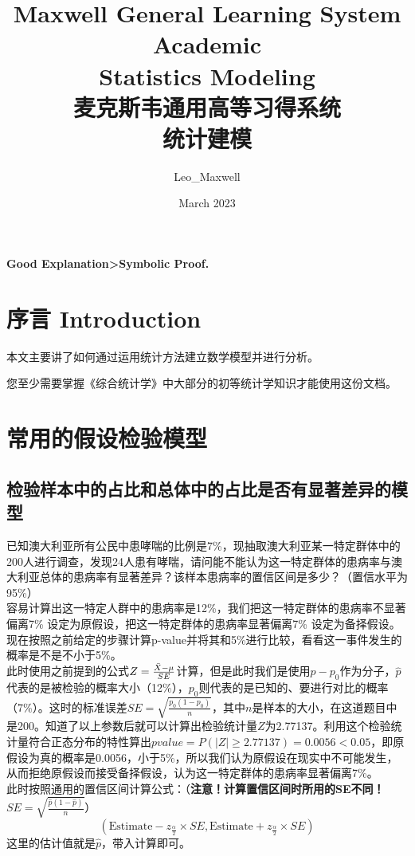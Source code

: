 \documentclass[UTF8]{ctexart}
\title{Maxwell General Learning System Academic\\ Statistics Modeling\\ 麦克斯韦通用高等习得系统\\ 统计建模}
\author{Leo\_Maxwell }
\date{March 2023}
\begin{document}
\maketitle
\vfill
\begin{center}
\textbf{Good Explanation\textgreater Symbolic Proof.}
\end{center}
\vfill

\newpage
\tableofcontents
\newpage

\section*{序言 Introduction}
本文主要讲了如何通过运用统计方法建立数学模型并进行分析。

您至少需要掌握《综合统计学》中大部分的初等统计学知识才能使用这份文档。

\section{常用的假设检验模型}
\subsection{检验样本中的占比和总体中的占比是否有显著差异的模型}
已知澳大利亚所有公民中患哮喘的比例是7\%，现抽取澳大利亚某一特定群体中的200人进行调查，发现24人患有哮喘，请问能不能认为这一特定群体的患病率与澳大利亚总体的患病率有显著差异？该样本患病率的置信区间是多少？（置信水平为95\%）\\
\indent 容易计算出这一特定人群中的患病率是12\%，我们把这一特定群体的患病率不显著偏离7\% 设定为原假设，把这一特定群体的患病率显著偏离7\% 设定为备择假设。现在按照之前给定的步骤计算p-value并将其和5\%进行比较，看看这一事件发生的概率是不是不小于5\%。\\
\indent 此时使用之前提到的公式$Z=\frac{\Bar{X}-\mu}{SE}$计算，但是此时我们是使用$\hat{p}-p_0$作为分子，$\hat{p}$代表的是被检验的概率大小（12\%），$p_0$则代表的是已知的、要进行对比的概率（7\%）。这时的标准误差$SE=\sqrt{\frac{p_0\left(1-p_0\right)}{n}}$，其中$n$是样本的大小，在这道题目中是200。知道了以上参数后就可以计算出检验统计量$Z$为2.77137。利用这个检验统计量符合正态分布的特性算出$pvalue=P(|Z|\geq 2.77137)=0.0056<0.05$，即原假设为真的概率是0.0056，小于5\%，所以我们认为原假设在现实中不可能发生，从而拒绝原假设而接受备择假设，认为这一特定群体的患病率显著偏离7\%。\\
\indent 此时按照通用的置信区间计算公式：（\textbf{注意！计算置信区间时所用的SE不同！$SE=\sqrt{\frac{\hat{p}\left(1-\hat{p}\right)}{n}}$}）
\[
\left(\text{Estimate}-z_{\frac{\alpha}{2}}\times SE,\text{Estimate}+z_{\frac{\alpha}{2}}\times SE\right)
\]
\indent 这里的估计值就是$\hat{p}$，带入计算即可。
\end{document}
